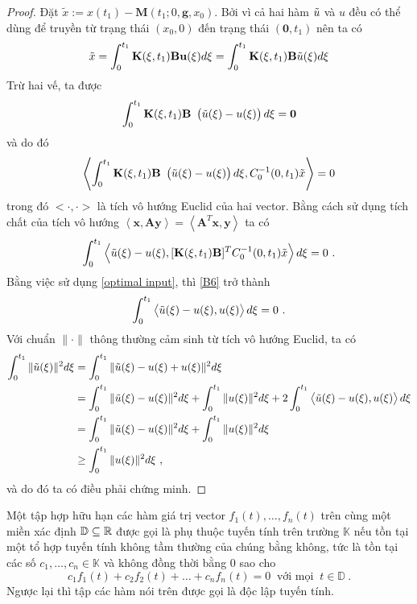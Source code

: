 \begin{proof}
Đặt $\tilde{x} := x(t_1)-\mathbf{M}(t_1;0,\mathbf{g},x_0)$. Bởi vì cả hai hàm $\tilde{u}$ và $u$ đều có thể dùng để truyền từ trạng thái $(x_0,0)$ đến trạng thái $(\mathbf{0},t_1)$ nên ta có
\begin{equation*}
	\tilde{x}=\int_{0}^{t_1}\mathbf{K}(\xi,t_1)\mathbf{Bu}(\xi)d\xi = \int_{0}^{t_1}\mathbf{K}(\xi,t_1)\mathbf{B} \tilde{u}(\xi)d\xi
\end{equation*}
Trừ hai vế, ta được
%
\begin{equation*}
	\int_{0}^{t_1}\mathbf{K}(\xi,t_1)\mathbf{B} \ \left( \tu(\xi)-u(\xi) \right) d\xi=\mathbf{0}
\end{equation*}
%
và do đó 
\begin{equation*}
	\left\langle\int_{0}^{t_1}\mathbf{K}(\xi,t_1)\mathbf{B} \ \left( \tilde{u}(\xi)-u(\xi) \right) d\xi,C^{-1}_0(0,t_1)\tilde{x} \right\rangle =0
\end{equation*}
trong đó $<\cdot,\cdot>$ là tích vô hướng Euclid của hai vector. Bằng cách sử dụng tích chất của tích vô hướng $\left\langle\mathbf{x,Ay}\right\rangle = \left\langle \mathbf{A}^T\mathbf{x,y} \right\rangle$ ta có
%
\begin{equation}\label{B6}
	\int_{0}^{t_1}\left\langle\tilde{u}(\xi)-u(\xi),[\mathbf{K}(\xi,t_1)\mathbf{B}]^TC^{-1}_0(0,t_1)\tilde{x} \right\rangle d\xi = 0  \ .
\end{equation}
%
Bằng việc sử dụng \eqref{optimal input}, thì \eqref{B6} trở thành
\begin{equation*}
	\int_{0}^{t_1}\left\langle\tilde{u}(\xi)-u(\xi),u(\xi)\right\rangle d\xi = 0 \ .
\end{equation*}
Với chuẩn $\|\cdot\|$ thông thường cảm sinh từ tích vô hướng Euclid, ta có 
%
\begin{align*}
\int_{0}^{t_1}\|\tilde{u}(\xi)\|^2d\xi &=\int_{0}^{t_1}\|\tilde{u}(\xi)-u(\xi)+u(\xi)\|^2 d\xi \\
&= \int_{0}^{t_1}\|\tilde{u}(\xi)-u(\xi)\|^2d\xi + \int_{0}^{t_1}\|u(\xi)\|^2d\xi + 2\int_{0}^{t_1}\left<\tilde{u}(\xi)-u(\xi),u(\xi) \right>d\xi \\  
&= \int_{0}^{t_1}\|\tilde{u}(\xi)-u(\xi)\|^2d\xi + \int_{0}^{t_1}\|u(\xi)\|^2d\xi \\
& \geq \int_{0}^{t_1}\|u(\xi)\|^2d\xi \ ,
\end{align*}
%
và do đó ta có điều phải chứng minh.
\end{proof}


\begin{dng}\label{linear independent}
Một tập hợp hữu hạn các hàm giá trị vector $f_1(t),\dots,f_n(t)$ trên cùng một miền xác định $\mathbb{D} \subseteq \mathbb{R}$ được gọi là phụ thuộc tuyến tính trên trường $\mathbb{K}$ nếu tồn tại 
một tổ hợp tuyến tính không tầm thường của chúng bằng không, tức là tồn tại các số $c_1,\dots,c_n \in \mathbb{K}$ và không đồng thời bằng $0$ sao cho 
%
\[
c_1 f_1(t) + c_2 f_2(t) + \dots + c_n f_n(t) = 0 \ \mbox{ với mọi } \ t\in \mathbb{D} \ .
\]
%
Ngược lại thì tập các hàm nói trên được gọi là độc lập tuyến tính.
\end{dng}

